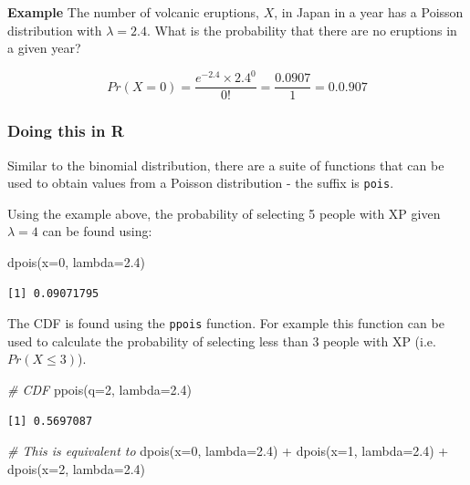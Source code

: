 \documentclass[
  oneside]{krantz}
\newenvironment{Shaded}{\begin{snugshade}}{\end{snugshade}}
\newcommand{\AttributeTok}[1]{\textcolor[rgb]{0.77,0.63,0.00}{#1}}
\newcommand{\CommentTok}[1]{\textcolor[rgb]{0.56,0.35,0.01}{\textit{#1}}}
\newcommand{\DecValTok}[1]{\textcolor[rgb]{0.00,0.00,0.81}{#1}}
\newcommand{\FloatTok}[1]{\textcolor[rgb]{0.00,0.00,0.81}{#1}}
\newcommand{\FunctionTok}[1]{\textcolor[rgb]{0.00,0.00,0.00}{#1}}
\newcommand{\NormalTok}[1]{#1}
\newcommand{\SpecialCharTok}[1]{\textcolor[rgb]{0.00,0.00,0.00}{#1}}
\begin{document}
\textbf{Example} The number of volcanic eruptions, \(X\), in Japan in a year has a Poisson distribution with \(\lambda = 2.4\). What is the probability that there are no eruptions in a given year?

\[ Pr(X=0) = \frac{e^{-2.4} \times 2.4^ 0}{0!} = \frac{0.0907}{1} = 0.0.907\]

\hypertarget{doing-this-in-r-5}{%
\subsubsection{Doing this in R}\label{doing-this-in-r-5}}

Similar to the binomial distribution, there are a suite of functions that can be used to obtain values from a Poisson distribution - the suffix is \texttt{pois}.

Using the example above, the probability of selecting 5 people with XP given \(\lambda=4\) can be found using:

\begin{Shaded}
\begin{Highlighting}[]
\FunctionTok{dpois}\NormalTok{(}\AttributeTok{x=}\DecValTok{0}\NormalTok{, }\AttributeTok{lambda=}\FloatTok{2.4}\NormalTok{)}
\end{Highlighting}
\end{Shaded}

\begin{verbatim}
[1] 0.09071795
\end{verbatim}

The CDF is found using the \texttt{ppois} function. For example this function can be used to calculate the probability of selecting less than 3 people with XP (i.e.~\(Pr(X \le 3)\)).

\begin{Shaded}
\begin{Highlighting}[]
\CommentTok{\# CDF }
\FunctionTok{ppois}\NormalTok{(}\AttributeTok{q=}\DecValTok{2}\NormalTok{, }\AttributeTok{lambda=}\FloatTok{2.4}\NormalTok{)}
\end{Highlighting}
\end{Shaded}

\begin{verbatim}
[1] 0.5697087
\end{verbatim}

\begin{Shaded}
\begin{Highlighting}[]
\CommentTok{\# This is equivalent to}
\FunctionTok{dpois}\NormalTok{(}\AttributeTok{x=}\DecValTok{0}\NormalTok{, }\AttributeTok{lambda=}\FloatTok{2.4}\NormalTok{) }\SpecialCharTok{+} \FunctionTok{dpois}\NormalTok{(}\AttributeTok{x=}\DecValTok{1}\NormalTok{, }\AttributeTok{lambda=}\FloatTok{2.4}\NormalTok{) }\SpecialCharTok{+} \FunctionTok{dpois}\NormalTok{(}\AttributeTok{x=}\DecValTok{2}\NormalTok{, }\AttributeTok{lambda=}\FloatTok{2.4}\NormalTok{)}
\end{Highlighting}
\end{Shaded}
\end{document}
